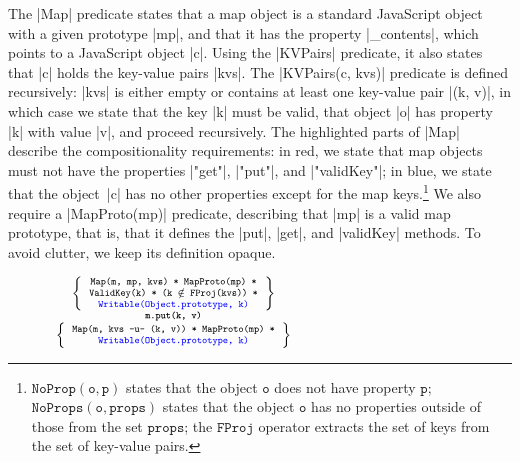 \smallskip
The \jsinline|Map| predicate states that a map object is a standard JavaScript object with a given prototype \jsinline|mp|, and that it has the property \jsinline|_contents|, which points to a  JavaScript object \jsinline|c|.
Using the \jsinline|KVPairs| predicate, %
it also states that \jsinline|c| holds the key-value pairs \jsinline|kvs|. 
The \jsinline|KVPairs(c, kvs)| predicate is defined recursively: \jsinline|kvs| is either empty or contains at least one key-value pair \jsinline|(k, v)|, 
in which case we state that the key \jsinline|k| must be valid, that object \jsinline|o| has  property \jsinline|k| with value \jsinline|v|, and proceed recursively.
The highlighted parts of \jsinline|Map| describe the compositionality requirements: in red, we state that map objects must not have the properties \jsinline|"get"|, \jsinline|"put"|, and \jsinline|"validKey"|; in blue, we state that the object~\jsinline|c| has no other properties except for the map keys.\footnote{$\mathtt{NoProp(o, p)}$  states that the object $\mathtt{o}$ does not have property $\mathtt{p}$; $\mathtt{NoProps(o, props)}$ states that the object $\mathtt{o}$ has no properties outside of those from the set $\mathtt{props}$; the $\mathtt{FProj}$ operator extracts the set of keys from the set of key-value pairs.}
%
We also require a \jsinline|MapProto(mp)| predicate, describing that \jsinline|mp| is a valid map prototype, that is, that it defines the \jsinline|put|, \jsinline|get|, and \jsinline|validKey| methods. To avoid clutter, we keep its definition opaque.

\begin{figure}
\vspace*{-0.3cm}
\hspace*{-0.8cm}
$
{\scriptsize
\begin{array}{c}
\left\{ {\begin{array}{c}
 \text{\texttt{Map(m, mp, kvs) * MapProto(mp) *}} \\
 \text{\texttt{ValidKey(k) * (k $\notin$ FProj(kvs)) *}} \\
 \text{\textcolor{blue}{\texttt{Writable(Object.prototype, k)}}}
\end{array}} \right\} \\
%
\text{\bfseries \texttt{m.put(k, v)}} \\[0.2mm]
%
\left\{ {\begin{array}{c}
 \text{\texttt{Map(m, kvs -u- (k, v)) * MapProto(mp) *}} \\
 \text{\textcolor{blue}{\texttt{Writable(Object.prototype, k)}}} \\
\end{array}} \right\}
\end{array}
} 
$
\vspace*{-0.4cm}
\end{figure}

